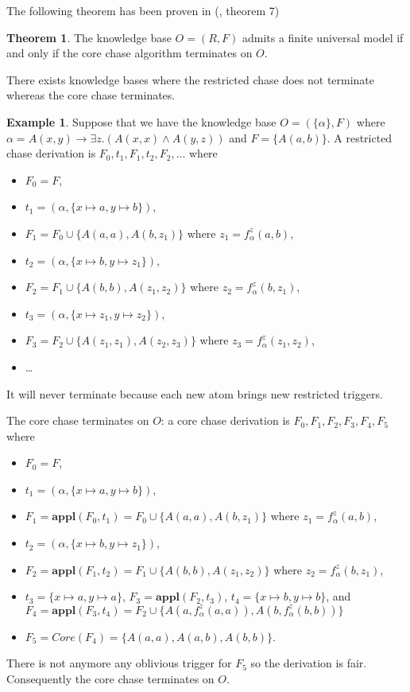 \documentclass{article}
\theoremstyle{definition}
\newtheorem{theorem}{Theorem}[section]
\newtheorem{example}{Example}[section]
\theoremstyle{remark}
\newcommand{\Appl}{\textbf{appl}}
\begin{document}
The following theorem has been proven in (\cite{core_chase}, theorem 7)

\begin{theorem}
The knowledge base $O = (R,F)$ admits a finite universal model if and only if the core chase algorithm terminates on $O$.
\end{theorem}


There exists knowledge bases where the restricted chase does not terminate whereas the core chase terminates. \begin{example}
Suppose that we have the knowledge base $O=(\{\alpha\},F)$ where $\alpha = A(x,y) \rightarrow \exists z.(A(x,x) \wedge A(y,z))$ and $F =  \{A(a,b)\}$. A restricted chase derivation is $F_0,t_1,F_1,t_2,F_2,...$ where 
\begin{itemize}
\item $F_0 = F$,
\item $t_1=(\alpha,\{x \mapsto a, y \mapsto b\})$, 
\item $F_1= F_0 \cup \{A(a,a),A(b,z_1)\}$ where $z_1 = f_\alpha^z(a,b)$,
\item $t_2 = (\alpha,\{x \mapsto b, y \mapsto z_1\})$, 
\item $F_2 = F_1 \cup \{A(b,b),A(z_1,z_2)\}$ where $z_2 = f_\alpha^z(b,z_1)$, 
\item $t_3 = (\alpha,\{x \mapsto z_1, y \mapsto z_2\})$, 
\item $F_3 =  F_2 \cup \{A(z_1,z_1),A(z_2,z_3)\}$ where $z_3 = f_\alpha^z(z_1,z_2)$,
\item \ldots\
\end{itemize}
It will never terminate because each new atom brings new restricted triggers. 

The core chase terminates on $O$: a core chase derivation is $F_0,F_1,F_2,F_3,F_4,F_5$ where 
\begin{itemize}
\item $F_0=F$, 
\item $t_1=(\alpha,\{x \mapsto a, y \mapsto b\})$, 
\item $F_1=\Appl(F_0,t_1) =F_0 \cup \{A(a,a),A(b,z_1)\}$ where $z_1 = f_\alpha^z(a,b)$, 
\item $t_2 = (\alpha,\{x \mapsto b, y \mapsto z_1\})$,
\item $F_2 =\Appl(F_1,t_2) =F_1 \cup \{A(b,b),A(z_1,z_2)\}$ where $z_2 = f_\alpha^z(b,z_1)$,
\item $t_3 = \{x \mapsto a, y \mapsto a\}$, $F_3=\Appl(F_2,t_3)$, $t_4 = \{x \mapsto b, y \mapsto b\}$, and $F_4=\Appl(F_3,t_4) = F_2 \cup \{A(a,f_\alpha^z(a,a)),A(b,f_\alpha^z(b,b))\}$
\item $F_5 = \textit{Core}(F_4)= \{A(a,a),A(a,b),A(b,b)\}$.
\end{itemize} 
There is not anymore any oblivious trigger for $F_5$ so the derivation is fair. Consequently the core chase terminates on $O$.

\end{example}
\end{document}
